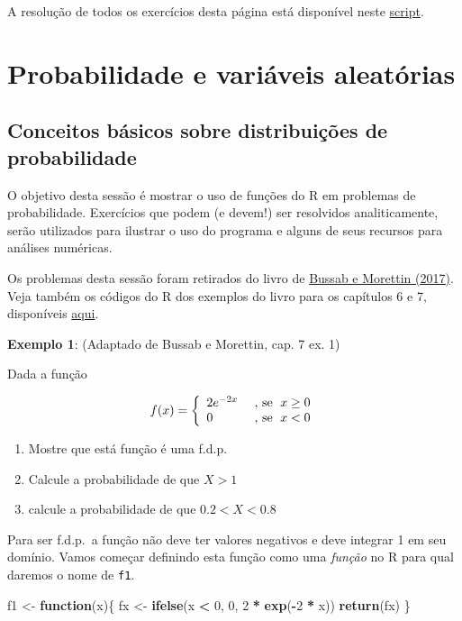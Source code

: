 \documentclass[10pt,a4paper]{book}
\newenvironment{Shaded}{\begin{snugshade}}{\end{snugshade}}
\newcommand{\KeywordTok}[1]{\textcolor[rgb]{0.13,0.29,0.53}{\textbf{#1}}}
\newcommand{\DecValTok}[1]{\textcolor[rgb]{0.00,0.00,0.81}{#1}}
\newcommand{\StringTok}[1]{\textcolor[rgb]{0.31,0.60,0.02}{#1}}
\newcommand{\ControlFlowTok}[1]{\textcolor[rgb]{0.13,0.29,0.53}{\textbf{#1}}}
\newcommand{\OperatorTok}[1]{\textcolor[rgb]{0.81,0.36,0.00}{\textbf{#1}}}
\newcommand{\NormalTok}[1]{#1}
\providecommand{\tightlist}{%
  \setlength{\itemsep}{0pt}\setlength{\parskip}{0pt}}
\begin{document}
A resolução de todos os exercícios desta página está disponível neste
\href{scripts/analise-exploratoria-exercicios.R}{script}.

\chapter{Probabilidade e variáveis
aleatórias}\label{probabilidade-e-variuxe1veis-aleatuxf3rias}

\section{Conceitos básicos sobre distribuições de
probabilidade}\label{conceitos-buxe1sicos-sobre-distribuiuxe7uxf5es-de-probabilidade}

O objetivo desta sessão é mostrar o uso de funções do R em problemas de
probabilidade. Exercícios que podem (e devem!) ser resolvidos
analiticamente, serão utilizados para ilustrar o uso do programa e
alguns de seus recursos para análises numéricas.

Os problemas desta sessão foram retirados do livro de
\href{https://www.ime.usp.br/~pam/EstBas.html}{Bussab e Morettin
(2017)}. Veja também os códigos do R dos exemplos do livro para os
capítulos 6 e 7, disponíveis
\href{https://rpubs.com/EstatBasica/Introd}{aqui}.

\textbf{Exemplo 1}: (Adaptado de Bussab e Morettin, cap. 7 ex. 1)

Dada a função

\[
\
  f(x) = \left\{ \begin{array}{ll}
      2 e^{-2x} & \mbox{ , se $ \; x \geq 0$} \cr
      0   & \mbox{ , se  $ \; x < 0$}
    \end{array} \right.
\
\]

\begin{enumerate}
\def\labelenumi{\alph{enumi}.}
\tightlist
\item
  Mostre que está função é uma f.d.p.
\item
  Calcule a probabilidade de que \(X > 1\)
\item
  calcule a probabilidade de que \(0.2 < X < 0.8\)
\end{enumerate}

Para ser f.d.p.~a função não deve ter valores negativos e deve integrar
1 em seu domínio. Vamos começar definindo esta função como uma
\emph{função} no R para qual daremos o nome de \texttt{f1}.

\begin{Shaded}
\begin{Highlighting}[]
\NormalTok{f1 <-}\StringTok{ }\ControlFlowTok{function}\NormalTok{(x)\{}
\NormalTok{    fx <-}\StringTok{ }\KeywordTok{ifelse}\NormalTok{(x }\OperatorTok{<}\StringTok{ }\DecValTok{0}\NormalTok{, }\DecValTok{0}\NormalTok{, }\DecValTok{2} \OperatorTok{*}\StringTok{ }\KeywordTok{exp}\NormalTok{(}\OperatorTok{-}\DecValTok{2} \OperatorTok{*}\StringTok{ }\NormalTok{x))}
    \KeywordTok{return}\NormalTok{(fx)}
\NormalTok{\}}
\end{Highlighting}
\end{Shaded}
\end{document}
